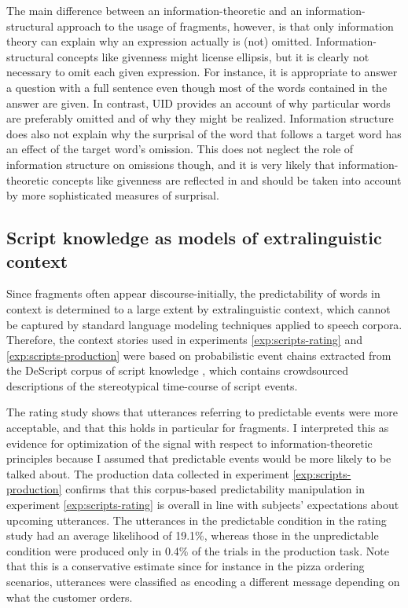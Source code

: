 The main difference between an information-theoretic and an information-structural approach to the usage of fragments, however, is that only information theory can  explain why an expression actually is (not) omitted. Information-structural concepts like givenness might license ellipsis, but it is clearly not necessary to omit each given expression. For instance, it is appropriate to answer a question with a full sentence even though most of the words contained in the answer are given. In contrast, UID provides an account of why particular words are preferably omitted and of why they might be realized. Information structure does also not explain why the surprisal of the word that follows a target word has an effect of the target word's omission. This does not neglect the role of information structure on omissions though, and it is very likely that information-theoretic concepts like givenness are reflected in and should be taken into account by more sophisticated measures of surprisal.

\subsection{Script knowledge as models of extralinguistic context}
Since fragments often appear discourse-initially, the predictability of words in context is determined to a large extent by extralinguistic context, which cannot be captured by standard language modeling techniques applied to speech corpora. Therefore, the context stories used in experiments \ref{exp:scripts-rating} and \ref{exp:scripts-production} were based on probabilistic event chains extracted from the DeScript corpus of script knowledge \citep{wanzare.etal2016}, which contains crowdsourced descriptions of the stereotypical time-course of script events.

The rating study shows that utterances referring to predictable events were more acceptable, and that this holds in particular for fragments. I interpreted this as evidence for optimization of the signal with respect to information-theoretic principles because I assumed that predictable events would be more likely to be talked about. The production data collected in experiment \ref{exp:scripts-production} confirms that this corpus-based predictability manipulation in experiment \ref{exp:scripts-rating} is overall in line with subjects' expectations about upcoming utterances. The utterances in the predictable condition in the rating study had an average likelihood  of 19.1\%, whereas those in the unpredictable condition were produced only in 0.4\% of the trials in the production task. Note that this is a conservative estimate since for instance in the pizza ordering scenarios, utterances were classified as encoding a different message depending on what the customer orders.

